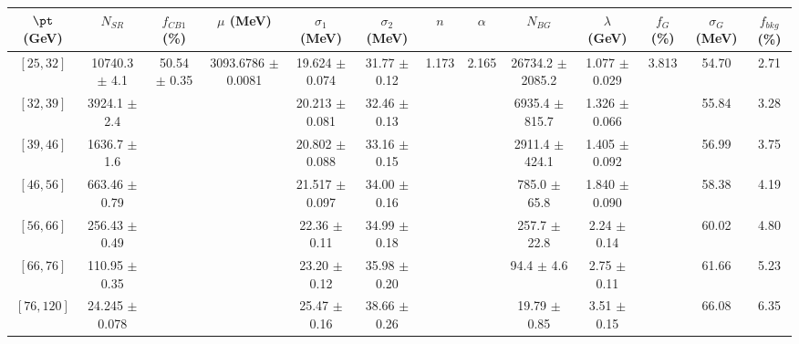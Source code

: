 \begin{tabular}{c||c|c|c|c|c|c|c|c|c|c|c||c}
$\pt$ (GeV) & $N_{SR}$ & $f_{CB1}$ (\%) & $\mu$ (MeV) & $\sigma_1$ (MeV) & $\sigma_2$ (MeV) & $n$ & $\alpha$ & $N_{BG}$ & $\lambda$ (GeV) & $f_G$ (\%) & $\sigma_G$ (MeV) & $f_{bkg}$ (\%) \\
\hline
$[25, 32]$ & 10740.3 $\pm$ 4.1 & \multirow{7}{*}{50.54 $\pm$ 0.35} & \multirow{7}{*}{3093.6786 $\pm$ 0.0081} & 19.624 $\pm$ 0.074 & 31.77 $\pm$ 0.12 & \multirow{7}{*}{1.173} & \multirow{7}{*}{2.165} & 26734.2 $\pm$ 2085.2 & 1.077 $\pm$ 0.029 & \multirow{7}{*}{3.813} & 54.70 & 2.71\\
$[32, 39]$ & 3924.1 $\pm$ 2.4 &  &  & 20.213 $\pm$ 0.081 & 32.46 $\pm$ 0.13 &  &  & 6935.4 $\pm$ 815.7 & 1.326 $\pm$ 0.066 &  & 55.84 & 3.28\\
$[39, 46]$ & 1636.7 $\pm$ 1.6 &  &  & 20.802 $\pm$ 0.088 & 33.16 $\pm$ 0.15 &  &  & 2911.4 $\pm$ 424.1 & 1.405 $\pm$ 0.092 &  & 56.99 & 3.75\\
$[46, 56]$ & 663.46 $\pm$ 0.79 &  &  & 21.517 $\pm$ 0.097 & 34.00 $\pm$ 0.16 &  &  & 785.0 $\pm$ 65.8 & 1.840 $\pm$ 0.090 &  & 58.38 & 4.19\\
$[56, 66]$ & 256.43 $\pm$ 0.49 &  &  & 22.36 $\pm$ 0.11 & 34.99 $\pm$ 0.18 &  &  & 257.7 $\pm$ 22.8 & 2.24 $\pm$ 0.14 &  & 60.02 & 4.80\\
$[66, 76]$ & 110.95 $\pm$ 0.35 &  &  & 23.20 $\pm$ 0.12 & 35.98 $\pm$ 0.20 &  &  & 94.4 $\pm$ 4.6 & 2.75 $\pm$ 0.11 &  & 61.66 & 5.23\\
$[76, 120]$ & 24.245 $\pm$ 0.078 &  &  & 25.47 $\pm$ 0.16 & 38.66 $\pm$ 0.26 &  &  & 19.79 $\pm$ 0.85 & 3.51 $\pm$ 0.15 &  & 66.08 & 6.35\\
\end{tabular}
